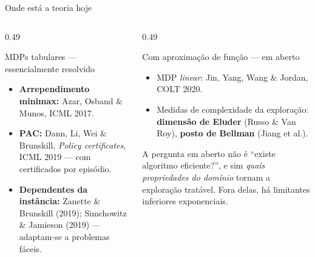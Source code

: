 \documentclass[aspectratio=169, 11pt]{beamer}
\begin{document}
\begin{frame}{Onde está a teoria hoje}
  \begin{columns}[T]
    \begin{column}{0.49\textwidth}
      \begin{teobox}{MDPs tabulares --- essencialmente resolvido}
        \begin{itemize}
          \item \textbf{Arrependimento minimax:} Azar, Osband \& Munos, ICML 2017.
          \item \textbf{PAC:} Dann, Li, Wei \& Brunskill, \textit{Policy certificates},
                ICML 2019 --- com certificados por episódio.
          \item \textbf{Dependentes da instância:} Zanette \& Brunskill (2019);
                Simchowitz \& Jamieson (2019) --- adaptam-se a problemas fáceis.
        \end{itemize}
      \end{teobox}
    \end{column}
    \begin{column}{0.49\textwidth}
      \begin{teobox}{Com aproximação de função --- em aberto}
        \begin{itemize}
          \item MDP \emph{linear}: Jin, Yang, Wang \& Jordan, COLT 2020.
          \item Medidas de complexidade da exploração: \textbf{dimensão de Eluder}
                (Russo \& Van Roy), \textbf{posto de Bellman} (Jiang et al.).
        \end{itemize}
      \end{teobox}
      \begin{alertabox}
        A pergunta em aberto não é ``existe algoritmo eficiente?'', e sim \emph{quais
        propriedades do domínio} tornam a exploração tratável. Fora delas, há limitantes
        inferiores exponenciais.
      \end{alertabox}
    \end{column}
  \end{columns}
\end{frame}
\end{document}
